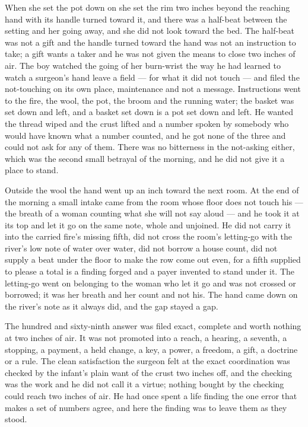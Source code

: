 When she set the pot down on  she set the rim two inches beyond the reaching hand with its handle turned toward it, and there was a half-beat between the setting and her going away, and she did not look toward the bed. The half-beat was not a gift and the handle turned toward the hand was not an instruction to take; a gift wants a taker and he was not given the means to close two inches of air. The boy watched the going of her burn-wrist the way he had learned to watch a surgeon's hand leave a field --- for what it did not touch --- and filed the not-touching on its own place, maintenance and not a message. Instructions went to the fire, the wool, the pot, the broom and the running water; the basket was set down and left, and a basket set down is a pot set down and left. He wanted the thread wiped and the crust lifted and a number spoken by somebody who would have known what a number counted, and he got none of the three and could not ask for any of them. There was no bitterness in the not-asking either, which was the second small betrayal of the morning, and he did not give it a place to stand.

\scenebreak

Outside the wool the hand went up an inch toward the next room. At the end of the morning a small intake came from the room whose floor does not touch his --- the breath of a woman counting what she will not say aloud --- and he took it at its top and let it go on the same note, whole and unjoined. He did not carry it into the carried fire's missing fifth, did not cross the room's letting-go with the river's low note of water over water, did not borrow a house count, did not supply a beat under the floor to make the row come out even, for a fifth supplied to please a total is a finding forged and a payer invented to stand under it. The letting-go went on belonging to the woman who let it go and was not crossed or borrowed; it was her breath and her count and not his. The hand came down on the river's note as it always did, and the gap stayed a gap.

The hundred and sixty-ninth answer was filed exact, complete and worth nothing at two inches of air. It was not promoted into a reach, a hearing, a seventh, a stopping, a payment, a held change, a key, a power, a freedom, a gift, a doctrine or a rule. The clean satisfaction the surgeon felt at the exact coordination was checked by the infant's plain want of the crust two inches off, and the checking was the work and he did not call it a virtue; nothing bought by the checking could reach two inches of air. He had once spent a life finding the one error that makes a set of numbers agree, and here the finding was to leave them as they stood.

